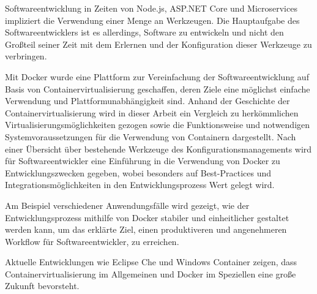 Softwareentwicklung in Zeiten von Node.js, ASP.NET Core und Microservices impliziert die Verwendung einer Menge an Werkzeugen.
Die Hauptaufgabe des Softwareentwicklers ist es allerdings, Software zu entwickeln und nicht den Großteil seiner Zeit mit dem Erlernen und der Konfiguration dieser Werkzeuge zu verbringen.

Mit Docker wurde eine Plattform zur Vereinfachung der Softwareentwicklung auf Basis von Containervirtualisierung geschaffen, deren Ziele eine möglichst einfache Verwendung und Plattformunabhängigkeit sind.
Anhand der Geschichte der Containervirtualisierung wird in dieser Arbeit ein Vergleich zu herkömmlichen Virtualisierungsmöglichkeiten gezogen sowie die Funktionsweise und notwendigen Systemvoraussetzungen für die Verwendung von Containern dargestellt.
Nach einer Übersicht über bestehende Werkzeuge des Konfigurationsmanagements wird für Softwareentwickler eine Einführung in die Verwendung von Docker zu Entwicklungszwecken gegeben, wobei besonders auf Best-Practices und Integrationsmöglichkeiten in den Entwicklungsprozess Wert gelegt wird.

Am Beispiel verschiedener Anwendungsfälle wird gezeigt, wie der Entwicklungsprozess mithilfe von Docker stabiler und einheitlicher gestaltet werden kann, um das erklärte Ziel, einen produktiveren und angenehmeren Workflow für Softwareentwickler, zu erreichen.

Aktuelle Entwicklungen wie Eclipse Che und Windows Container zeigen, dass Containervirtualisierung im Allgemeinen und Docker im Speziellen eine große Zukunft bevorsteht.
